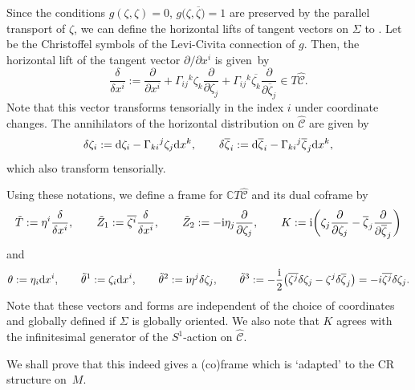 \documentclass[11pt]{article}
\numberwithin{equation}{section}
\renewcommand\d{\delta}
\renewcommand\th{\theta}
\newcommand\ol{\overline}
\newcommand{\wh}{\widehat}
\numberwithin{equation}{section}
\begin{document}
Since the conditions $g(\zeta, \zeta)=0$, $g\bigl(\zeta, \ol\zeta\bigr)=1$ are preserved by the parallel transport of $\zeta$, we can define the horizontal lifts of tangent vectors on $\Sigma$ to \smash{$\wh{\mathcal{C}}$}. Let  be the Christoffel symbols of the Levi-Civita connection of $g$. Then, the horizontal lift of the tangent vector $\partial/\partial x^i$ is given~by
\[
\frac{\d}{\d x^i}:=\frac{\partial}{\partial x^i}+\Gamma_{ij}{}^k\zeta_k\frac{\partial}{\partial \zeta_j}+\Gamma_{ij}{}^k\ol{\zeta_k}\frac{\partial}{\partial \ol{\zeta}_j}\in T\wh{\mathcal{C}}.
\]
Note that this vector transforms tensorially in the index $i$ under coordinate changes. The annihilators of the horizontal distribution on $\wh{\mathcal{C}}$ are given by
\[
\d \zeta_i:={\rm d}\zeta_i-\Gamma_{ki}{}^j \zeta_j {\rm d}x^k, \qquad \d \ol{\zeta}_i:={\rm d}\ol{\zeta}_i-\Gamma_{ki}{}^j \ol{\zeta}_j {\rm d}x^k,
\]
which also transform tensorially.

Using these notations, we define a frame
\smash{$\bigl(\tilde T, \tilde Z_1, \tilde Z_2, \tilde Z_{\ol1}, \tilde Z_{\ol2}, K\bigr)$}
 for $\mathbb{C}T\wh{\mathcal{C}}$ and its dual coframe \smash{$\bigl(\th, \tilde\th^1, \tilde\th^2, \tilde\th^{\ol1}, \tilde\th^{\ol2}, \tilde\th^3\bigr)$} by
\[
\tilde T:=\eta^i \frac{\d}{\d x^i}, \qquad \tilde Z_1:=\ol{\zeta^i}\frac{\d}{\d x^i}, \qquad \tilde Z_2:=-{\rm i}\eta_j\frac{\partial}{\partial \zeta_j}, \qquad
K:={\rm i}\biggl(\zeta_j\frac{\partial}{\partial \zeta_j}
-\ol{\zeta}_j\frac{\partial}{\partial \ol{\zeta}_j}\biggr)
\]
and
\[
\th:=\eta_i {\rm d}x^i, \qquad \tilde\th^1:=\zeta_i {\rm d}x^i, \qquad \tilde\th^2:={\rm i}\eta^j\d\zeta_j, \qquad \tilde\th^3:=-\frac{{\rm i}}{2}\bigl(\ol{\zeta^j}\d\zeta_j-\zeta^j\d\ol{\zeta}_j\bigr)=-i\ol{\zeta^j}\d\zeta_j.
\]
Note that these vectors and forms are independent of the choice of coordinates and globally defined if $\Sigma$ is globally oriented. We also note that $K$ agrees with the infinitesimal generator of the $S^1$-action on $\wh{\mathcal{C}}$.

We shall prove that this indeed gives a (co)frame which is `adapted' to the CR structure on~$M$.
\end{document}
